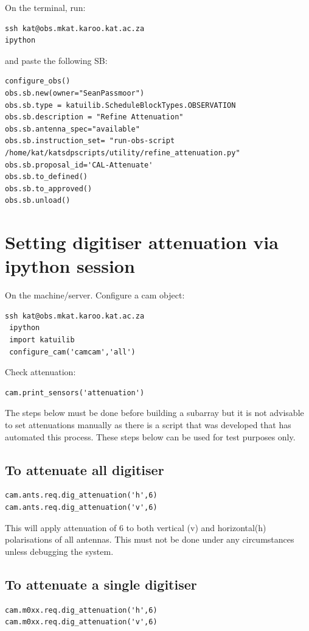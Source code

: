On the terminal, run:
\begin{lstlisting}[style=DOS]
ssh kat@obs.mkat.karoo.kat.ac.za
ipython
\end{lstlisting}
and paste the following SB:

\begin{lstlisting}[style=DOS]
configure_obs()
obs.sb.new(owner="SeanPassmoor") 
obs.sb.type = katuilib.ScheduleBlockTypes.OBSERVATION
obs.sb.description = "Refine Attenuation" 
obs.sb.antenna_spec="available"
obs.sb.instruction_set= "run-obs-script /home/kat/katsdpscripts/utility/refine_attenuation.py"
obs.sb.proposal_id='CAL-Attenuate'
obs.sb.to_defined()
obs.sb.to_approved()
obs.sb.unload()

\end{lstlisting}

\section{ Setting digitiser attenuation via ipython session}
On the  machine/server. Configure a cam object:
 \begin{lstlisting}[style=DOS]
 ssh kat@obs.mkat.karoo.kat.ac.za
 ipython
 import katuilib
 configure_cam('camcam','all')
 \end{lstlisting}


Check attenuation:
\begin{lstlisting}[style=DOS]
cam.print_sensors('attenuation')

\end{lstlisting}

The steps below must be done before building a subarray but it is not advisable to set attenuations manually as there is a script that  was developed that has automated this process. These steps below can be used for test purposes only.


\subsection{ To attenuate all digitiser}
\begin{lstlisting}[style=DOS]
cam.ants.req.dig_attenuation('h',6)  
cam.ants.req.dig_attenuation('v',6)
\end{lstlisting}

This will apply attenuation of 6 to both vertical (v) and horizontal(h) polarisations of all antennas. This must not be done under any circumstances unless debugging the system. 
\subsection {To attenuate a single digitiser}
\begin{lstlisting}[style=DOS]
cam.m0xx.req.dig_attenuation('h',6)  
cam.m0xx.req.dig_attenuation('v',6) 
\end{lstlisting}
 
